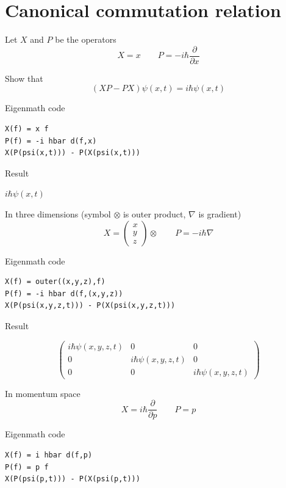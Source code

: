 

\section*{Canonical commutation relation}

Let $X$ and $P$ be the operators
\begin{equation*}
X=x\qquad P=-i\hbar\frac{\partial}{\partial x}
\end{equation*}

Show that
\begin{equation*}
(XP-PX)\psi(x,t)=i\hbar\psi(x,t)
\end{equation*}

Eigenmath code
{\color{blue}
\begin{verbatim}
X(f) = x f
P(f) = -i hbar d(f,x)
X(P(psi(x,t))) - P(X(psi(x,t)))
\end{verbatim}}

Result

\bigskip
$i\hbar\psi(x,t)$

\bigskip
In three dimensions (symbol $\otimes$ is outer product, $\nabla$ is gradient)
\begin{equation*}
X=\begin{pmatrix}x\\y\\z\end{pmatrix}\otimes\qquad P=-i\hbar\nabla
\end{equation*}

Eigenmath code
{\color{blue}
\begin{verbatim}
X(f) = outer((x,y,z),f)
P(f) = -i hbar d(f,(x,y,z))
X(P(psi(x,y,z,t))) - P(X(psi(x,y,z,t)))
\end{verbatim}}

Result

\begin{equation*}
\begin{pmatrix}
i\hbar\psi(x,y,z,t)&0&0\\
0&i\hbar\psi(x,y,z,t)&0\\
0&0&i\hbar\psi(x,y,z,t)
\end{pmatrix}
\end{equation*}

In momentum space
\begin{equation*}
X=i\hbar\frac{\partial}{\partial p}
\qquad
P=p
\end{equation*}

Eigenmath code
{\color{blue}
\begin{verbatim}
X(f) = i hbar d(f,p)
P(f) = p f
X(P(psi(p,t))) - P(X(psi(p,t)))
\end{verbatim}}

